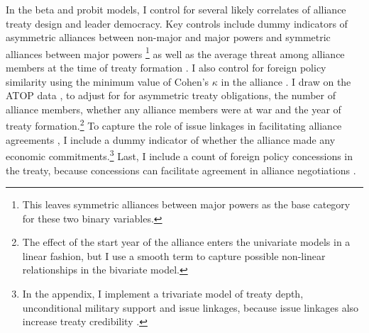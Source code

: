 \documentclass[12pt]{article}
\begin{document}
In the beta and probit models, I control for several likely correlates of alliance treaty design and leader democracy. 
Key controls include dummy indicators of asymmetric alliances between non-major and major powers and symmetric alliances between major powers \citep{Mattes2012}\footnote{This leaves symmetric alliances between major powers as the base category for these two binary variables.} as well as the average threat among alliance members at the time of treaty formation \citep{LeedsSavun2007}. 
I also control for foreign policy similarity using the minimum value of Cohen's $\kappa$ in the alliance \citep{Hage2011}.
I draw on the ATOP data \citep{Leedsetal2002}, to adjust for for asymmetric treaty obligations, the number of alliance members, whether any alliance members were at war and the year of treaty formation.\footnote{The effect of the start year of the alliance enters the univariate models in a linear fashion, but I use a smooth term to capture possible non-linear relationships in the bivariate model.}  
To capture the role of issue linkages in facilitating alliance agreements \citep{Poast2012}, I include a dummy indicator of whether the alliance made any economic commitments.\footnote{In the appendix, I implement a trivariate model of treaty depth, unconditional military support and issue linkages, because issue linkages also increase treaty credibility \citep{ Poast2013}.}  
Last, I include a count of foreign policy concessions in the treaty, because concessions can facilitate agreement in alliance negotiations \citep{Johnson2015}. 
\end{document}
